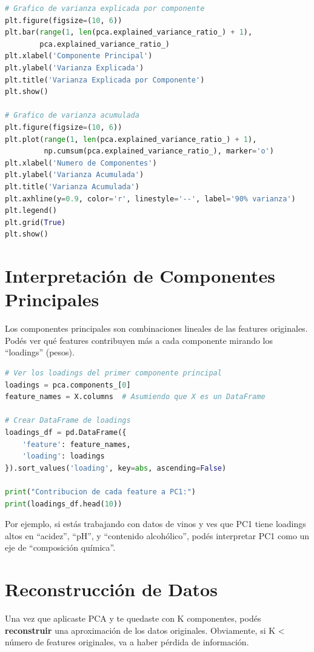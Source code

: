 \documentclass[12pt]{article}
\begin{document}
\begin{lstlisting}[language=Python]
# Grafico de varianza explicada por componente
plt.figure(figsize=(10, 6))
plt.bar(range(1, len(pca.explained_variance_ratio_) + 1),
        pca.explained_variance_ratio_)
plt.xlabel('Componente Principal')
plt.ylabel('Varianza Explicada')
plt.title('Varianza Explicada por Componente')
plt.show()

# Grafico de varianza acumulada
plt.figure(figsize=(10, 6))
plt.plot(range(1, len(pca.explained_variance_ratio_) + 1),
         np.cumsum(pca.explained_variance_ratio_), marker='o')
plt.xlabel('Numero de Componentes')
plt.ylabel('Varianza Acumulada')
plt.title('Varianza Acumulada')
plt.axhline(y=0.9, color='r', linestyle='--', label='90% varianza')
plt.legend()
plt.grid(True)
plt.show()
\end{lstlisting}

\section{Interpretación de Componentes Principales}

Los componentes principales son combinaciones lineales de las features originales. Podés ver qué features contribuyen más a cada componente mirando los ``loadings'' (pesos).

\begin{lstlisting}[language=Python]
# Ver los loadings del primer componente principal
loadings = pca.components_[0]
feature_names = X.columns  # Asumiendo que X es un DataFrame

# Crear DataFrame de loadings
loadings_df = pd.DataFrame({
    'feature': feature_names,
    'loading': loadings
}).sort_values('loading', key=abs, ascending=False)

print("Contribucion de cada feature a PC1:")
print(loadings_df.head(10))
\end{lstlisting}

Por ejemplo, si estás trabajando con datos de vinos y ves que PC1 tiene loadings altos en ``acidez'', ``pH'', y ``contenido alcohólico'', podés interpretar PC1 como un eje de ``composición química''.

\section{Reconstrucción de Datos}

Una vez que aplicaste PCA y te quedaste con K componentes, podés \textbf{reconstruir} una aproximación de los datos originales. Obviamente, si K < número de features originales, va a haber pérdida de información.
\end{document}
